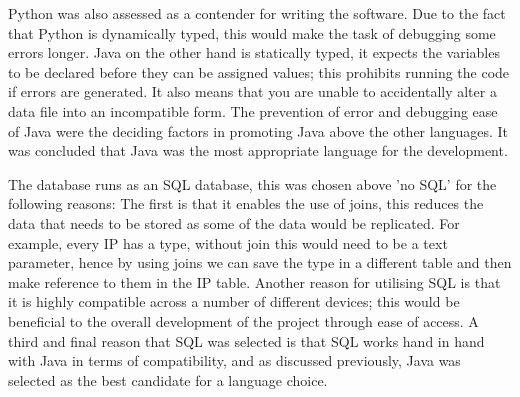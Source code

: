 Python was also assessed as a contender for writing the software. Due to the fact that Python is dynamically typed, this would make the task of debugging some errors longer. Java on the other hand is statically typed, it expects the variables to be declared before they can be assigned values; this prohibits running the code if errors are generated. It also means that you are unable to accidentally alter a data file into an incompatible form. The prevention of error and debugging ease of Java were the deciding factors in promoting Java above the other languages. It was concluded that Java was the most appropriate language for the development. 

The database runs as an SQL database, this was chosen above 'no SQL' for the following reasons: The first is that it enables the use of joins, this reduces the data that needs to be stored as some of the data would be replicated. For example, every IP has a type, without join this would need to be a text parameter, hence by using joins we can save the type in a different table and then make reference to them in the IP table. Another reason for utilising SQL is that it is highly compatible across a number of different devices; this would be beneficial to the overall development of the project through ease of access. A third and final reason that SQL was selected is that SQL works hand in hand with Java in terms of compatibility, and as discussed previously, Java was selected as the best candidate for a language choice. 

